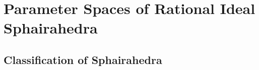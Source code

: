 \documentclass[suppldata, dvipdfmx]{interact}
\theoremstyle{plain}%
\theoremstyle{definition}
\theoremstyle{remark}
\theoremstyle{problemstyle}
\begin{document}
%
%


\section{Parameter Spaces of Rational Ideal Sphairahedra}

\subsection{Classification of Sphairahedra}
\end{document}
